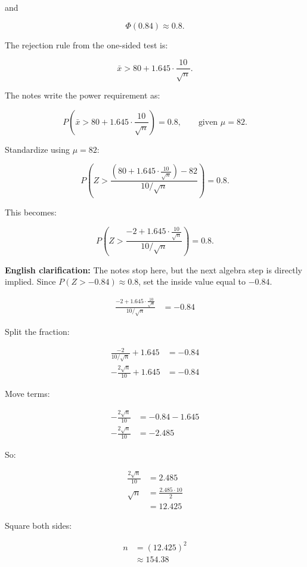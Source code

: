 \documentclass[10pt]{article}
\begin{document}
and

\[
\Phi(0.84)\approx 0.8.
\]

The rejection rule from the one-sided test is:

\[
\bar{x}>
80+1.645\cdot \frac{10}{\sqrt{n}}.
\]

The notes write the power requirement as:

\[
P\left(
\bar{x}>
80+1.645\cdot \frac{10}{\sqrt{n}}
\right)
=0.8,
\qquad \text{given }\mu=82.
\]

Standardize using $\mu=82$:

\[
P\left(
Z>
\frac{
\left(80+1.645\cdot \frac{10}{\sqrt{n}}\right)-82
}
{10/\sqrt{n}}
\right)
=0.8.
\]

This becomes:

\[
P\left(
Z>
\frac{
-2+1.645\cdot \frac{10}{\sqrt{n}}
}
{10/\sqrt{n}}
\right)
=0.8.
\]

\textbf{English clarification:}
The notes stop here, but the next algebra step is directly implied.
Since $P(Z>-0.84)\approx 0.8$, set the inside value equal to $-0.84$.

\begin{align*}
\frac{
-2+1.645\cdot \frac{10}{\sqrt{n}}
}
{10/\sqrt{n}}
&=-0.84
\end{align*}

Split the fraction:

\begin{align*}
\frac{-2}{10/\sqrt{n}}
+1.645
&=-0.84 \\[2mm]
-\frac{2\sqrt{n}}{10}
+1.645
&=-0.84
\end{align*}

Move terms:

\begin{align*}
-\frac{2\sqrt{n}}{10}
&=
-0.84-1.645 \\[2mm]
-\frac{2\sqrt{n}}{10}
&=
-2.485
\end{align*}

So:

\begin{align*}
\frac{2\sqrt{n}}{10}
&=2.485 \\[2mm]
\sqrt{n}
&=
\frac{2.485\cdot 10}{2} \\[2mm]
&=12.425
\end{align*}

Square both sides:

\begin{align*}
n
&=
(12.425)^2 \\[2mm]
&\approx 154.38
\end{align*}
\end{document}
